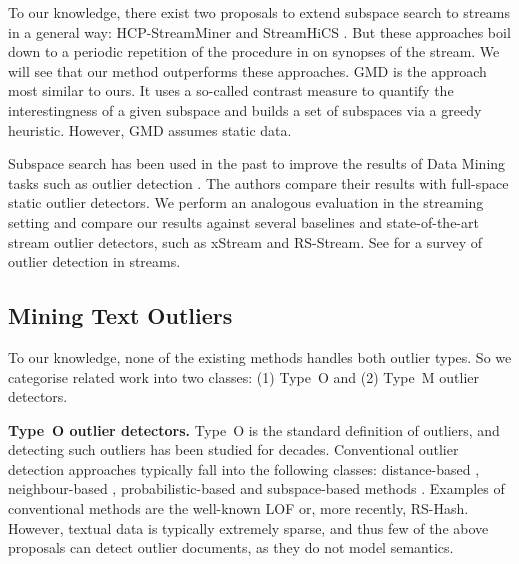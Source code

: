 To our knowledge, there exist two proposals to extend subspace search to streams in a general way: HCP-StreamMiner \cite{vanea2012instant} and Stream\gls{HiCS} \cite{becker2016concept}. 
But these approaches boil down to a periodic repetition of the procedure in \cite{DBLP:conf/icde/KellerMB12} on synopses of the stream. 
We will see that our method outperforms these approaches. %
\gls{GMD} is the approach most similar to ours. 
It uses a so-called contrast measure \cite{DBLP:conf/icde/KellerMB12} to quantify the interestingness of a given subspace and builds a set of subspaces via a greedy heuristic. 
However, \gls{GMD} assumes static data.

Subspace search has been used in the past to improve the results of Data Mining tasks such as outlier detection \cite{DBLP:conf/icde/ZhangGW08, DBLP:conf/icde/KellerMB12,  DBLP:journals/ijdsa/TrittenbachB19}. The authors compare their results with full-space static outlier detectors. %
We perform an analogous evaluation in the streaming setting and compare our results against several baselines and state-of-the-art stream outlier detectors, such as xStream \cite{10.1145/3219819.3220107} and \gls{RS-Stream}. See \cite{DBLP:journals/tkde/GuptaGAH14} for a survey of outlier detection in streams.

\subsection{Mining Text Outliers}
\label{relatedwork:MiningTextOutliers}

To our knowledge, none of the existing methods handles both outlier types. 
So we categorise related work into two classes: (1) Type~O and (2) Type~M outlier detectors. 

\textbf{Type~O outlier detectors.} Type~O is the standard definition of outliers, and detecting such outliers has been studied for decades. 
Conventional outlier detection approaches typically fall into the following classes: distance-based \cite{knox1998algorithms,ramaswamy2000efficient}, neighbour-based \cite{DBLP:conf/sigmod/BreunigKNS00,kriegel2008angle}, probabilistic-based \cite{kim2012RKDE,tipping1999PPCA} and subspace-based methods \cite{DBLP:journals/kais/SatheA18,lazarevic2005feature,muller2012outlier,DBLP:conf/icde/KellerMB12,kriegel2012outlier}. Examples of conventional methods are the well-known \gls{LOF} or, more recently, \gls{RS-Hash}. However, textual data is typically extremely sparse, and thus few of the above proposals can detect outlier documents, as they do not model semantics.

